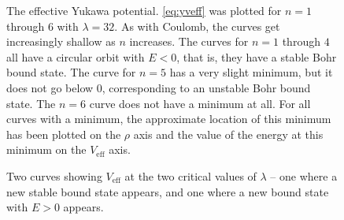 \documentclass[12pt,twoside]{reedthesis}
\begin{document}
\begin{figure}[h]
	\caption[The effective Yukawa potential]{The effective Yukawa potential. \eqref{eq:yveff} was plotted for $n = 1$ through $6$ with $\lambda = 32$. As with Coulomb, the curves get increasingly shallow as $n$ increases. The curves for $n = 1$ through $4$ all have a circular orbit with $E < 0$, that is, they have a stable Bohr bound state. The curve for $n = 5$ has a very slight minimum, but it does not go below $0$, corresponding to an unstable Bohr bound state. The $n = 6$ curve does not have a minimum at all. For all curves with a minimum, the approximate location of this minimum has been plotted on the $\rho$ axis and the value of the energy at this minimum on the $V_{\mathrm{eff}}$ axis.}
	\label{fig:yveff}
\end{figure}
\begin{figure}[h]
	\caption[The two critical values of $\lambda$]{Two curves showing $V_{\mathrm{eff}}$ at the two critical values of $\lambda$ -- one where a new stable bound state appears, and one where a new bound state with $E > 0$ appears.}
	\label{fig:critpoints}
\end{figure}
\end{document}
